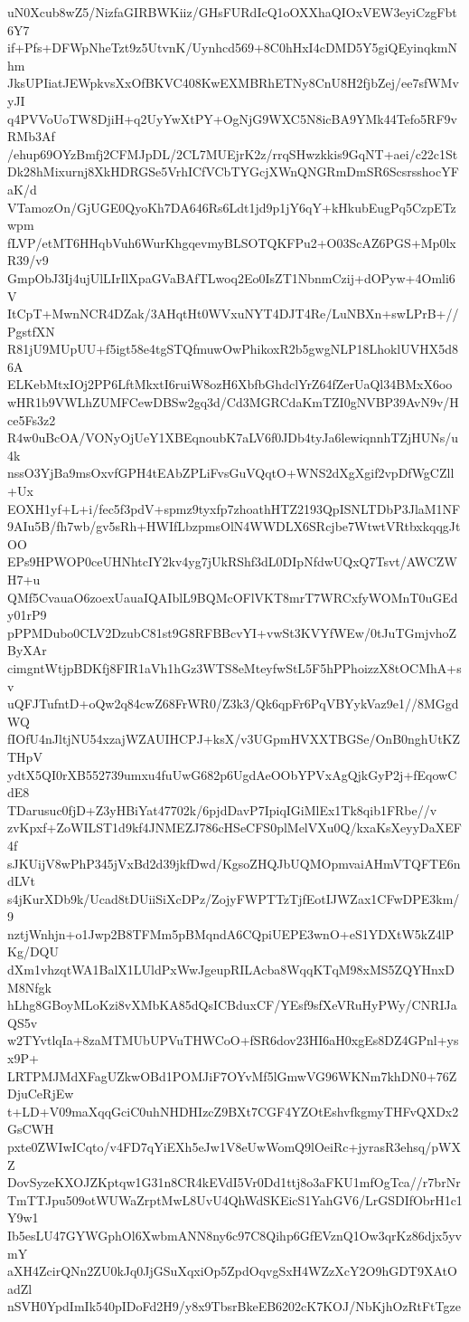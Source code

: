 uN0Xcub8wZ5/NizfaGIRBWKiiz/GHsFURdIcQ1oOXXhaQIOxVEW3eyiCzgFbt6Y7
if+Pfs+DFWpNheTzt9z5UtvnK/Uynhcd569+8C0hHxI4cDMD5Y5giQEyinqkmNhm
JksUPIiatJEWpkvsXxOfBKVC408KwEXMBRhETNy8CnU8H2fjbZej/ee7sfWMvyJI
q4PVVoUoTW8DjiH+q2UyYwXtPY+OgNjG9WXC5N8icBA9YMk44Tefo5RF9vRMb3Af
/ehup69OYzBmfj2CFMJpDL/2CL7MUEjrK2z/rrqSHwzkkis9GqNT+aei/c22c1St
Dk28hMixurnj8XkHDRGSe5VrhICfVCbTYGcjXWnQNGRmDmSR6ScsrsshocYFaK/d
VTamozOn/GjUGE0QyoKh7DA646Rs6Ldt1jd9p1jY6qY+kHkubEugPq5CzpETzwpm
fLVP/etMT6HHqbVuh6WurKhgqevmyBLSOTQKFPu2+O03ScAZ6PGS+Mp0lxR39/v9
GmpObJ3Ij4ujUlLIrIlXpaGVaBAfTLwoq2Eo0IsZT1NbnmCzij+dOPyw+4Omli6V
ItCpT+MwnNCR4DZak/3AHqtHt0WVxuNYT4DJT4Re/LuNBXn+swLPrB+//PgstfXN
R81jU9MUpUU+f5igt58e4tgSTQfmuwOwPhikoxR2b5gwgNLP18LhoklUVHX5d86A
ELKebMtxIOj2PP6LftMkxtI6ruiW8ozH6XbfbGhdclYrZ64fZerUaQl34BMxX6oo
wHR1b9VWLhZUMFCewDBSw2gq3d/Cd3MGRCdaKmTZI0gNVBP39AvN9v/Hce5Fs3z2
R4w0uBcOA/VONyOjUeY1XBEqnoubK7aLV6f0JDb4tyJa6lewiqnnhTZjHUNs/u4k
nssO3YjBa9msOxvfGPH4tEAbZPLiFvsGuVQqtO+WNS2dXgXgif2vpDfWgCZll+Ux
EOXH1yf+L+i/fec5f3pdV+spmz9tyxfp7zhoathHTZ2193QpISNLTDbP3JlaM1NF
9AIu5B/fh7wb/gv5sRh+HWIfLbzpmsOlN4WWDLX6SRcjbe7WtwtVRtbxkqqgJtOO
EPs9HPWOP0ceUHNhtcIY2kv4yg7jUkRShf3dL0DIpNfdwUQxQ7Tsvt/AWCZWH7+u
QMf5CvauaO6zoexUauaIQAIblL9BQMcOFlVKT8mrT7WRCxfyWOMnT0uGEdy01rP9
pPPMDubo0CLV2DzubC81st9G8RFBBcvYI+vwSt3KVYfWEw/0tJuTGmjvhoZByXAr
cimgntWtjpBDKfj8FIR1aVh1hGz3WTS8eMteyfwStL5F5hPPhoizzX8tOCMhA+sv
uQFJTufntD+oQw2q84cwZ68FrWR0/Z3k3/Qk6qpFr6PqVBYykVaz9e1//8MGgdWQ
fIOfU4nJltjNU54xzajWZAUIHCPJ+ksX/v3UGpmHVXXTBGSe/OnB0nghUtKZTHpV
ydtX5QI0rXB552739umxu4fuUwG682p6UgdAeOObYPVxAgQjkGyP2j+fEqowCdE8
TDarusuc0fjD+Z3yHBiYat47702k/6pjdDavP7IpiqIGiMlEx1Tk8qib1FRbe//v
zvKpxf+ZoWILST1d9kf4JNMEZJ786cHSeCFS0plMelVXu0Q/kxaKsXeyyDaXEF4f
sJKUijV8wPhP345jVxBd2d39jkfDwd/KgsoZHQJbUQMOpmvaiAHmVTQFTE6ndLVt
s4jKurXDb9k/Ucad8tDUiiSiXcDPz/ZojyFWPTTzTjfEotIJWZax1CFwDPE3km/9
nztjWnhjn+o1Jwp2B8TFMm5pBMqndA6CQpiUEPE3wnO+eS1YDXtW5kZ4lPKg/DQU
dXm1vhzqtWA1BalX1LUldPxWwJgeupRILAcba8WqqKTqM98xMS5ZQYHnxDM8Nfgk
hLhg8GBoyMLoKzi8vXMbKA85dQsICBduxCF/YEsf9sfXeVRuHyPWy/CNRIJaQS5v
w2TYvtlqIa+8zaMTMUbUPVuTHWCoO+fSR6dov23HI6aH0xgEs8DZ4GPnl+ysx9P+
LRTPMJMdXFagUZkwOBd1POMJiF7OYvMf5lGmwVG96WKNm7khDN0+76ZDjuCeRjEw
t+LD+V09maXqqGciC0uhNHDHIzcZ9BXt7CGF4YZOtEshvfkgmyTHFvQXDx2GsCWH
pxte0ZWIwICqto/v4FD7qYiEXh5eJw1V8eUwWomQ9lOeiRc+jyrasR3ehsq/pWXZ
DovSyzeKXOJZKptqw1G31n8CR4kEVdI5Vr0Dd1ttj8o3aFKU1mfOgTca//r7brNr
TmTTJpu509otWUWaZrptMwL8UvU4QhWdSKEicS1YahGV6/LrGSDIfObrH1c1Y9w1
Ib5esLU47GYWGphOl6XwbmANN8ny6c97C8Qihp6GfEVznQ1Ow3qrKz86djx5yvmY
aXH4ZcirQNn2ZU0kJq0JjGSuXqxiOp5ZpdOqvgSxH4WZzXcY2O9hGDT9XAtOadZl
nSVH0YpdImIk540pIDoFd2H9/y8x9TbsrBkeEB6202cK7KOJ/NbKjhOzRtFtTgze
